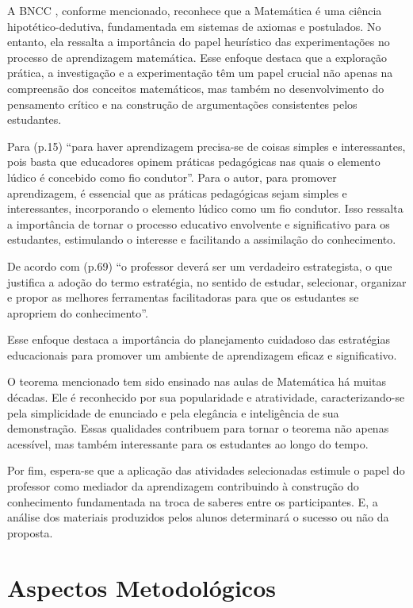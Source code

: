 A BNCC \cite{Educacao.2018}, conforme mencionado, reconhece que a Matemática é uma ciência hipotético-dedutiva, fundamentada em sistemas de axiomas e postulados. No entanto, ela ressalta a importância do papel heurístico das experimentações no processo de aprendizagem matemática. Esse enfoque destaca que a exploração prática, a investigação e a experimentação têm um papel crucial não apenas na compreensão dos conceitos matemáticos, mas também no desenvolvimento do pensamento crítico e na construção de argumentações consistentes pelos estudantes.

Para  (p.15) ``para haver aprendizagem precisa-se de coisas simples e interessantes, pois basta que educadores opinem práticas pedagógicas nas quais o elemento lúdico é concebido como fio condutor''. Para o autor, para promover aprendizagem, é essencial que as práticas pedagógicas sejam simples e interessantes, incorporando o elemento lúdico como um fio condutor. Isso ressalta a importância de tornar o processo educativo envolvente e significativo para os estudantes, estimulando o interesse e facilitando a assimilação do conhecimento.

De acordo com  (p.69) ``o professor deverá ser um verdadeiro estrategista, o que justifica a adoção do termo estratégia, no sentido de estudar, selecionar, organizar e propor as melhores ferramentas facilitadoras para que os estudantes se apropriem do conhecimento''.

Esse enfoque destaca a importância do planejamento cuidadoso das estratégias educacionais para promover um ambiente de aprendizagem eficaz e significativo.

O teorema mencionado tem sido ensinado nas aulas de Matemática há muitas décadas. Ele é reconhecido por sua popularidade e atratividade, caracterizando-se pela simplicidade de enunciado e pela elegância e inteligência de sua demonstração. Essas qualidades contribuem para tornar o teorema não apenas acessível, mas também interessante para os estudantes ao longo do tempo.

Por fim, espera-se que a aplicação das atividades selecionadas estimule o papel do professor como mediador da aprendizagem contribuindo à construção do conhecimento fundamentada na troca de saberes entre os participantes. E, a análise dos materiais produzidos pelos alunos determinará o sucesso ou não da proposta.

\chapter{Aspectos Metodológicos} \label{cap:3_aspectos}

